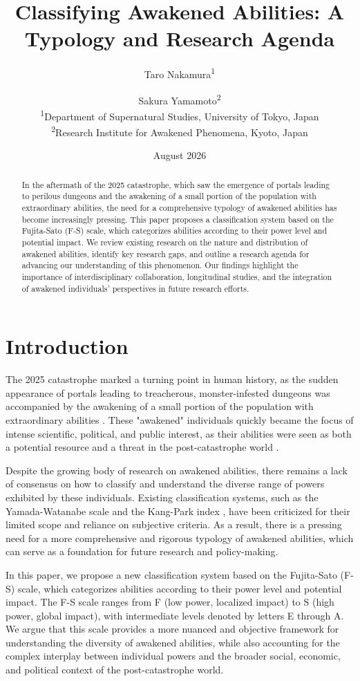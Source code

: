 \documentclass[12pt]{article}
\title{Classifying Awakened Abilities: A Typology and Research Agenda}
\author{Taro Nakamura\textsuperscript{1} \and Sakura Yamamoto\textsuperscript{2} \\
\small \textsuperscript{1}Department of Supernatural Studies, University of Tokyo, Japan\\
\small \textsuperscript{2}Research Institute for Awakened Phenomena, Kyoto, Japan}
\date{August 2026}
\begin{document}
\maketitle

\begin{abstract}
In the aftermath of the 2025 catastrophe, which saw the emergence of portals leading to perilous dungeons and the awakening of a small portion of the population with extraordinary abilities, the need for a comprehensive typology of awakened abilities has become increasingly pressing. This paper proposes a classification system based on the Fujita-Sato (F-S) scale, which categorizes abilities according to their power level and potential impact. We review existing research on the nature and distribution of awakened abilities, identify key research gaps, and outline a research agenda for advancing our understanding of this phenomenon. Our findings highlight the importance of interdisciplinary collaboration, longitudinal studies, and the integration of awakened individuals' perspectives in future research efforts.
\end{abstract}

\section{Introduction}
The 2025 catastrophe marked a turning point in human history, as the sudden appearance of portals leading to treacherous, monster-infested dungeons was accompanied by the awakening of a small portion of the population with extraordinary abilities \cite{Kim2027}. These "awakened" individuals quickly became the focus of intense scientific, political, and public interest, as their abilities were seen as both a potential resource and a threat in the post-catastrophe world \cite{Chen2026, Ishikawa2026}.

Despite the growing body of research on awakened abilities, there remains a lack of consensus on how to classify and understand the diverse range of powers exhibited by these individuals. Existing classification systems, such as the Yamada-Watanabe scale \cite{Yamada2025} and the Kang-Park index \cite{Kang2026}, have been criticized for their limited scope and reliance on subjective criteria. As a result, there is a pressing need for a more comprehensive and rigorous typology of awakened abilities, which can serve as a foundation for future research and policy-making.

In this paper, we propose a new classification system based on the Fujita-Sato (F-S) scale, which categorizes abilities according to their power level and potential impact. The F-S scale ranges from F (low power, localized impact) to S (high power, global impact), with intermediate levels denoted by letters E through A. We argue that this scale provides a more nuanced and objective framework for understanding the diversity of awakened abilities, while also accounting for the complex interplay between individual powers and the broader social, economic, and political context of the post-catastrophe world.
\end{document}
